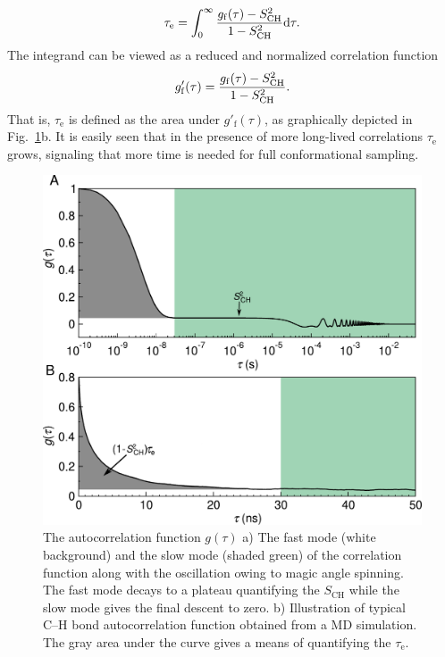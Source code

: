 \documentclass[journal=jpcbfk,manuscript=article,layout=twocolumn]{achemso}
\begin{document}
\begin{equation}
\label{eq:teff}
\tau_\mathrm{e}=\int_{0}^{\infty}\frac{g_{\mathrm{f}}(\tau)-S^{2}_{\rm{CH}}}{1-S^2_{\mathrm{CH}}}\mathrm d\tau.
\end{equation}
The integrand can be viewed as a reduced and normalized correlation function
\begin{equation}
\label{eq:nBCF}
g'_{\mathrm{f}}(\tau)=\frac{g_{\mathrm{f}}(\tau)-S^{2}_{\rm{CH}}}{1-S^2_{\mathrm{CH}}}.
\end{equation}
That is, $\tau_\mathrm e$ is defined as the area under $g'_{\mathrm{f}}(\tau)$, as
graphically depicted in Fig.~\ref{fig:schem_teff}b.
It is easily seen that in the presence of more long-lived correlations $\tau_\mathrm{e}$ grows, signaling that more time is needed for full conformational sampling.  

\begin{figure}[t]
\includegraphics[scale=0.45]{./figures/gfun_draft.pdf} 
\caption{The autocorrelation function $g(\tau)$ a) The fast mode (white background) and the slow mode (shaded green) of the correlation function along with the oscillation owing to magic angle spinning. The fast mode decays to a plateau quantifying the $S_{\mathrm{CH}}$ while the slow mode gives the final descent to zero. b) Illustration of typical C--H bond autocorrelation function obtained from a MD simulation. The gray area under the curve gives a means of quantifying the $\tau_\mathrm{e}$. }
\label{fig:schem_teff}

\end{figure} 
\end{document}
